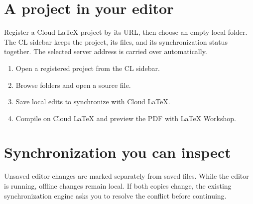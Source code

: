 \section{A project in your editor}

Register a Cloud LaTeX project by its URL, then choose an empty local folder.
The CL sidebar keeps the project, its files, and its synchronization status
together. The selected server address is carried over automatically.

\begin{enumerate}
  \item Open a registered project from the CL sidebar.
  \item Browse folders and open a source file.
  \item Save local edits to synchronize with Cloud LaTeX.
  \item Compile on Cloud LaTeX and preview the PDF with LaTeX Workshop.
\end{enumerate}

\section{Synchronization you can inspect}

Unsaved editor changes are marked separately from saved files.
While the editor is running, offline changes remain local. If both copies change, the existing
synchronization engine asks you to resolve the conflict before continuing.
